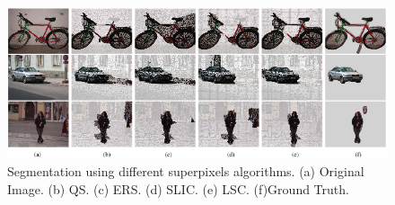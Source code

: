\begin{figure}[htbp]
    \centering
    \includegraphics[width = 1 \linewidth]{images/paper2/superpixelAlgo.png}
    \centering
    \caption{Segmentation using different superpixels algorithms. (a) Original Image. (b) QS. (c) ERS. (d) SLIC. (e) LSC. (f)Ground Truth.}
    \label{fig: superpixelSegmentation}
\end{figure}

